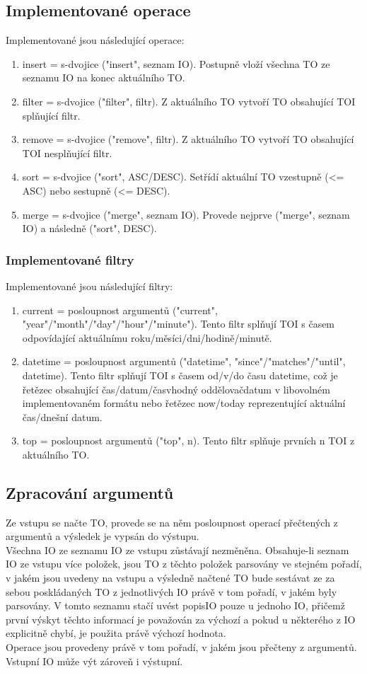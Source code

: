 \documentclass[11pt]{article}
\begin{document}
\subsection{Implementované operace}
Implementované jsou následující operace:
\begin{enumerate}[leftmargin=5mm]
\item insert = s-dvojice ("insert", seznam IO). Postupně vloží všechna TO ze seznamu IO na konec aktuálního TO.
\item filter = s-dvojice ("filter", filtr). Z aktuálního TO vytvoří TO obsahující TOI splňující filtr.
\item remove = s-dvojice ("remove", filtr). Z aktuálního TO vytvoří TO obsahující TOI nesplňující filtr.
\item sort = s-dvojice ("sort", ASC/DESC). Setřídí aktuální TO vzestupně (<= ASC) nebo sestupně (<= DESC).
\item merge = s-dvojice ("merge", seznam IO). Provede nejprve ("merge", seznam IO) a následně ("sort", DESC).
\end{enumerate}
\subsubsection{Implementované filtry}
Implementované jsou následující filtry:
\begin{enumerate}[leftmargin=5mm]
\item current = posloupnost argumentů ("current", "year"/"month"/"day"/"hour"/"minute"). Tento filtr splňují TOI s časem odpovídající aktuálnímu roku/měsíci/dni/hodině/minutě.
\item datetime = posloupnost argumentů ("datetime", "since"/"matches"/"until", datetime). Tento filtr splňují TOI s časem od/v/do času datetime, což je řetězec obsahující čas/datum/čas{vhodný oddělovač}datum v libovolném implementovaném formátu nebo řetězec now/today reprezentující aktuální čas/dnešní datum.
\item top = posloupnost argumentů ("top", n). Tento filtr splňuje prvních n TOI z aktuálního TO.
\end{enumerate}

\subsection{Zpracování argumentů}
Ze vstupu se načte TO, provede se na něm posloupnost operací přečtených z argumentů a výsledek je vypsán do výstupu.\\
Všechna IO ze seznamu IO ze vstupu zůstávají nezměněna. Obsahuje-li seznam IO ze vstupu více položek, jsou TO z těchto položek parsovány ve stejném pořadí, v jakém jsou uvedeny na vstupu a výsledně načtené TO bude sestávat ze za sebou poskládaných TO z jednotlivých IO právě v tom pořadí, v jakém byly parsovány. V tomto seznamu stačí uvést popisIO pouze u jednoho IO, přičemž první výskyt těchto informací je považován za výchozí a pokud u některého z IO explicitně chybí, je použita právě výchozí hodnota.\\
Operace jsou provedeny právě v tom pořadí, v jakém jsou přečteny z argumentů.\\ Vstupní IO může výt zároveň i výstupní.
\end{document}
